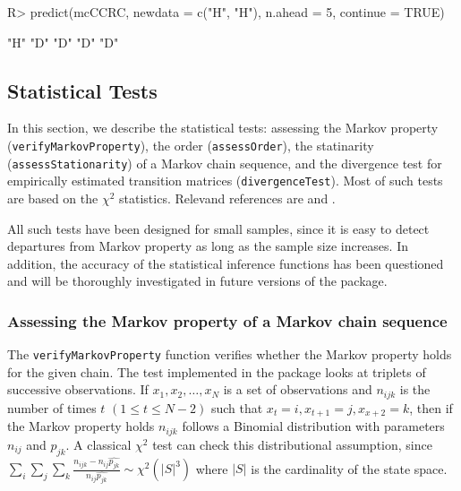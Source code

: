 \documentclass[article,nojss]{jss}
\begin{document}
\begin{CodeChunk}

\begin{CodeInput}
R> predict(mcCCRC, newdata = c("H", "H"), n.ahead = 5, continue = TRUE)
\end{CodeInput}

\begin{CodeOutput}
[1] "H" "D" "D" "D" "D"
\end{CodeOutput}
\end{CodeChunk}

\hypertarget{statistical-tests}{%
\subsection{Statistical Tests}\label{statistical-tests}}

In this section, we describe the statistical tests: assessing the Markov property (\texttt{verifyMarkovProperty}), the order (\texttt{assessOrder}), the statinarity (\texttt{assessStationarity}) of a Markov chain sequence, and the divergence test for empirically estimated transition matrices (\texttt{divergenceTest}). Most of such tests are based on the \(\chi ^2\) statistics. Relevand references are \cite{kullback1962tests} and \cite{anderson1957statistical}.

All such tests have been designed for small samples, since it is easy to detect departures from Markov property as long as the sample size increases. In addition, the accuracy of the statistical inference functions has been questioned and will be thoroughly investigated in future versions of the package.

\hypertarget{assessing-the-markov-property-of-a-markov-chain-sequence}{%
\subsubsection{Assessing the Markov property of a Markov chain sequence}\label{assessing-the-markov-property-of-a-markov-chain-sequence}}

The \texttt{verifyMarkovProperty} function verifies whether the Markov property holds for the given chain. The test implemented in the package looks at triplets of successive observations. If \(x_1, x_2, \ldots, x_N\) is a set of observations and \(n_{ijk}\) is the number of times \(t\) \(\left(1 \le t \le N-2 \right)\) such that \(x_t=i, x_{t+1}=j, x_{x+2}=k\), then if the Markov property holds \(n_{ijk}\) follows a Binomial distribution with parameters \(n_{ij}\) and \(p_{jk}\). A classical \(\chi^2\) test can check this distributional assumption, since \(\sum_{i}\sum_{j}\sum_{k}\frac{n_{ijk}-n_{ij}\hat{p_{jk}}}{n_{ij}\hat{p_{jk}}}\sim \chi^2\left(|S|^3 \right )\) where \(|S|\) is the cardinality of the state space.
\end{document}
